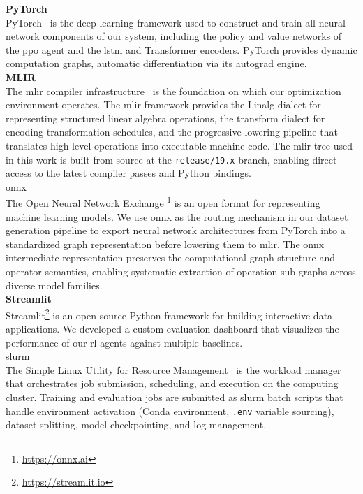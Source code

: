 \textbf{PyTorch} \\
PyTorch~\cite{paszke2019pytorch} is the deep learning framework used to construct and train all neural network components of our system, including the policy and value networks of the \gls{ppo} agent and the \gls{lstm} and Transformer encoders. PyTorch provides dynamic computation graphs, automatic differentiation via its autograd engine. \\

\textbf{MLIR} \\
The \gls{mlir} compiler infrastructure~\cite{lattner2021mlir} is the foundation on which our optimization environment operates. The \gls{mlir} framework provides the Linalg dialect for representing structured linear algebra operations, the transform dialect for encoding transformation schedules, and the progressive lowering pipeline that translates high-level operations into executable machine code. The \gls{mlir} tree used in this work is built from source at the \texttt{release/19.x} branch, enabling direct access to the latest compiler passes and Python bindings. \\ 

\gls{onnx} \\
The Open Neural Network Exchange \footnote{\url{https://onnx.ai}} is an open format for representing machine learning models. We use \gls{onnx} as the routing mechanism in our dataset generation pipeline to export neural network architectures from PyTorch into a standardized graph representation before lowering them to \gls{mlir}. The \gls{onnx} intermediate representation preserves the computational graph structure and operator semantics, enabling systematic extraction of operation sub-graphs across diverse model families. \\ 

\textbf{Streamlit} \\
Streamlit\footnote{\url{https://streamlit.io}} is an open-source Python framework for building interactive data applications. We developed a custom evaluation dashboard that visualizes the performance of our \gls{rl} agents against multiple baselines. \\

\gls{slurm} \\
The Simple Linux Utility for Resource Management~\cite{yoo2003slurm} is the workload manager that orchestrates job submission, scheduling, and execution on the computing cluster. Training and evaluation jobs are submitted as \gls{slurm} batch scripts that handle environment activation (Conda environment, \texttt{.env} variable sourcing), dataset splitting, model checkpointing, and log management. \\ 

